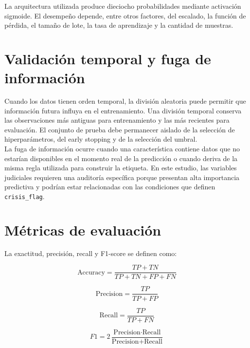 La arquitectura utilizada produce dieciocho probabilidades mediante activación sigmoide. El desempeño depende, entre otros factores, del escalado, la función de pérdida, el tamaño de lote, la tasa de aprendizaje y la cantidad de muestras.

\section{Validación temporal y fuga de información}

Cuando los datos tienen orden temporal, la división aleatoria puede permitir que información futura influya en el entrenamiento. Una división temporal conserva las observaciones más antiguas para entrenamiento y las más recientes para evaluación. El conjunto de prueba debe permanecer aislado de la selección de hiperparámetros, del early stopping y de la selección del umbral.\\

La fuga de información ocurre cuando una característica contiene datos que no estarían disponibles en el momento real de la predicción o cuando deriva de la misma regla utilizada para construir la etiqueta. En este estudio, las variables judiciales requieren una auditoría específica porque presentan alta importancia predictiva y podrían estar relacionadas con las condiciones que definen \texttt{crisis\_flag}.

\section{Métricas de evaluación}

La exactitud, precisión, recall y F1-score se definen como:

\begin{equation}
\text{Accuracy} = \frac{TP + TN}{TP + TN + FP + FN}
\end{equation}

\begin{equation}
\text{Precision} = \frac{TP}{TP + FP}
\end{equation}

\begin{equation}
\text{Recall} = \frac{TP}{TP + FN}
\end{equation}

\begin{equation}
F1 = 2 \frac{\text{Precision} \cdot \text{Recall}}{\text{Precision} + \text{Recall}}
\end{equation}

